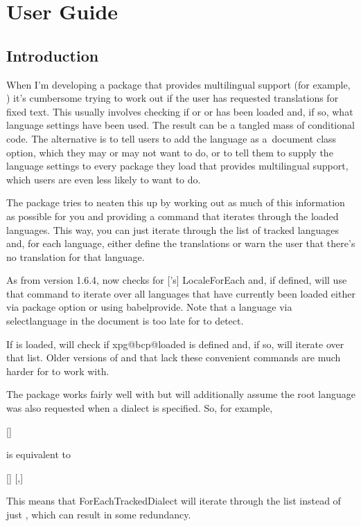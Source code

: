 \documentclass[titlepage=false,oneside,
 fontsize=12pt,captions=tableheading]{scrbook}
\begin{document}
\frontmatter
\tableofcontents
\listoftables

\mainmatter
\part{User Guide}

\chapter{Introduction}
\label{sec:intro}

When I'm developing a package that provides multilingual support
(for example, ) it's cumbersome trying to work out
if the user has requested translations for fixed text.  This usually
involves checking if  or  or
 has been loaded and, if so, what language settings
have been used. The result can be a tangled mass of conditional
code. The alternative is to tell users to add the language as
a~document class option, which they may or may not want to do, or to
tell them to supply the language settings to every package they load
that provides multilingual support, which users are even less likely
to want to do.

The  package tries to neaten this up by working out
as much of this information as possible for you and providing a
command that iterates through the loaded languages. This way, you
can just iterate through the list of tracked languages and, for each
language, either define the translations or warn the user that
there's no translation for that language.

As from version 1.6.4,  now checks for
['s] \gls{LocaleForEach} and, if defined, will
use that command to iterate over all languages that have currently
been loaded either via package option or using \gls{babelprovide}.
Note that  a language via \gls{selectlanguage}
in the document is too late for  to detect.

If  is loaded,  will check if
\gls{xpg@bcp@loaded} is defined and, if so, will iterate over that
list. Older versions of  and  that lack
these convenient commands are much harder for  to
work with.

The  package works fairly well with
 but will additionally assume the root language was
also requested when a dialect is specified. So, for example,
\begin{codebox}
[]
\end{codebox}
is equivalent to
\begin{compactcodebox}
[]
[,]
\end{compactcodebox}
This means that \gls{ForEachTrackedDialect} will iterate
through the list  instead of just
, which can result in some redundancy.
\end{document}
